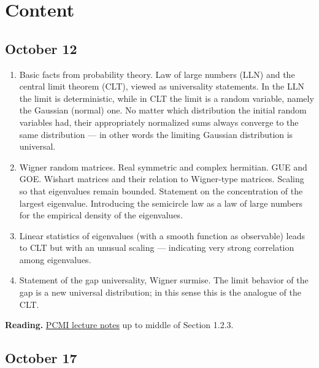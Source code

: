 \documentclass[a4paper]{article}
\begin{document}
\section{Content%
  \label{content}%
}


\subsection{October 12%
  \label{october-12}%
}

\begin{enumerate}
\item Basic facts from probability theory. Law of large numbers (LLN) and the central limit theorem (CLT), viewed as universality statements. In the LLN the limit is deterministic, while in CLT the limit is a random variable, namely the Gaussian (normal) one. No matter which distribution the initial random variables had, their appropriately normalized sums always converge to the same distribution — in other words the limiting Gaussian distribution is universal.

\item Wigner random matrices. Real symmetric and complex hermitian. GUE and GOE.  Wishart matrices and their relation to Wigner-type matrices. Scaling so that eigenvalues remain bounded. Statement on the concentration of the largest eigenvalue. Introducing the semicircle law as a law of large numbers for the empirical density of the eigenvalues.

\item Linear statistics of eigenvalues (with a smooth function as observable) leads to CLT but with an unusual scaling — indicating very strong correlation among eigenvalues.

\item Statement of the gap universality, Wigner surmise. The limit behavior of the gap is a new universal distribution; in this sense this is the analogue of the CLT.
\end{enumerate}

\textbf{Reading.} \href{pcmi.pdf}{PCMI lecture notes} up to middle of Section 1.2.3.


\subsection{October 17%
  \label{october-17}%
}
\end{document}

